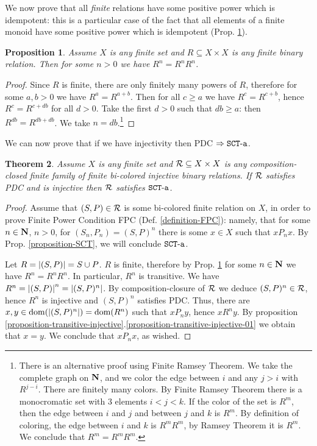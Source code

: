 \documentclass{lmcs}
\newtheorem{theorem}{Theorem}[section]
\newtheorem{proposition}[theorem]{Proposition}
\begin{document}
We now prove that all \emph{finite} relations have some positive power which is idempotent:
this is a particular case of the fact that all elements of a finite monoid 
have some positive power which is idempotent (Prop. \ref{proposition-idempotent-power}).

\begin{proposition}
\label{proposition-idempotent-power}
Assume $X$ is any finite set and $R \subseteq X \times X$ is any finite binary relation.
Then for some $n>0$ we have $R^n=R^nR^n$.
\end{proposition}

\begin{proof}
Since $R$ is finite, there are only finitely many powers of $R$, therefore 
for some $a,b>0$ we have $R^a = R^{a+b}$. Then for all $c \ge a$ we have $R^c = R^{c+b}$,
hence $R^c = R^{c+db}$ for all $d>0$. Take the first $d>0$ such that $db \ge a$: then 
$R^{db} = R^{db+db}$. We take $n=db$.\footnote{There is an alternative proof using
Finite Ramsey Theorem. We take the complete graph on ${\bf N}$, and we color the 
edge between $i$ and any $j>i$ with $R^{j-i}$. There are finitely many colors.
By Finite Ramsey Theorem there is a monocromatic set with $3$ elements $i<j<k$. 
If the color of the set is $R^m$, then the edge between $i$ and $j$ and between $j$ and $k$
is $R^m$. By definition of coloring, the edge between $i$ and $k$ is $R^mR^m$, 
by Ramsey Theorem it is $R^m$. We conclude that $R^m = R^mR^m$. }
\end{proof}

We can now prove that if we have injectivity then PDC $\Rightarrow {\tt SCT\mbox{-}a}$.

\begin{theorem}
Assume $X$ is any finite set and ${\mathcal R} \subseteq X \times X$ is any composition-closed
finite family of finite bi-colored \emph{injective} binary relations. If ${\mathcal R}$ satisfies PDC and 
is \emph{injective} then ${\mathcal R}$ satisfies ${\tt SCT\mbox{-}a}$.
\end{theorem}


\begin{proof}
Assume that $(S,P) \in {\mathcal R}$ is some bi-colored finite relation on $X$,
in order to prove Finite Power Condition FPC (Def. \ref{definition-FPC}): namely, 
that for some $n \in {\bf N}$, $n>0$, for $(S_n,P_n) = (S,P)^n$ there is some
$x \in X$ such that $x P_n x$. By Prop. \ref{proposition-SCT}, we will conclude ${\tt SCT\mbox{-}a}$.

Let $R = {| (S,P) |} = S \cup P$. $R$ is finite, therefore by Prop. 
\ref{proposition-idempotent-power} for some $n \in {\bf N}$ we have $R^n = R^nR^n$. 
In particular, $R^n$ is transitive. 
We have $R^n = {| (S,P) |}^n = {| (S,P)^n |}$. By composition-closure of 
${\mathcal R}$ we deduce  $(S,P)^n \in {\mathcal R}$, hence $R^n$ is injective and $(S,P)^n$ satisfies PDC. 
Thus, there are $x, y \in {\rm dom}({| (S,P)^n |}) = {\rm dom}(R^n)$ such that $x P_n y$, 
hence $x R^n y$. By proposition 
\ref{proposition-transitive-injective}.\ref{proposition-transitive-injective-01} 
we obtain that $x = y$. We conclude that $x P_n x$, as wished.
\end{proof}
\end{document}
